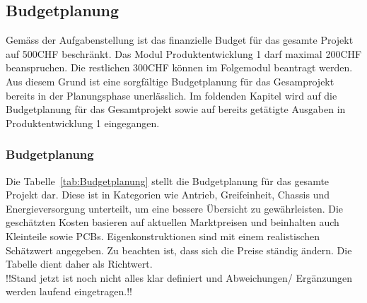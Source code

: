 \documentclass[main.tex]{subfiles} %
\begin{document}

\subsection{Budgetplanung}

Gemäss der Aufgabenstellung ist das finanzielle Budget für das gesamte Projekt
auf 500CHF beschränkt. Das Modul Produktentwicklung 1 darf maximal 200CHF
beanspruchen. Die restlichen 300CHF können im Folgemodul beantragt werden. Aus
diesem Grund ist eine sorgfältige Budgetplanung für das Gesamprojekt bereits in
der Planungsphase unerlässlich. Im foldenden Kapitel wird auf die Budgetplanung
für das Gesamtprojekt sowie auf bereits getätigte Ausgaben in
Produktentwicklung 1 eingegangen.

\subsubsection*{Budgetplanung}
Die Tabelle~\ref{tab:Budgetplanung} stellt die Budgetplanung für das gesamte Projekt dar. Diese ist in
Kategorien wie Antrieb, Greifeinheit, Chassis und Energieversorgung unterteilt, um eine
bessere Übersicht zu gewährleisten. Die geschätzten Kosten basieren auf aktuellen Marktpreisen und
beinhalten auch Kleinteile sowie PCBs. Eigenkonstruktionen sind mit einem realistischen
Schätzwert angegeben. Zu beachten ist, dass sich die Preise ständig ändern. Die Tabelle dient daher
als Richtwert.\\

!!Stand jetzt ist noch nicht alles klar definiert und Abweichungen/ Ergänzungen werden laufend eingetragen.!!

\newpage
\end{document}
